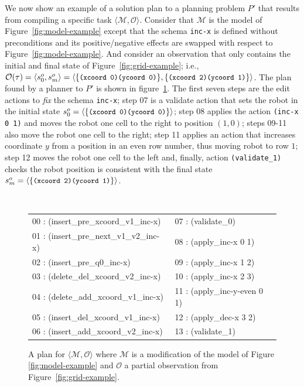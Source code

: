 \documentclass[letterpaper]{article} %
\newcommand{\tup}[1]{{\langle #1 \rangle}}
\begin{document}
We now show an example of a solution plan to a planning problem $P'$ that results from compiling a specific task $\tup{\mathcal{M},\mathcal{O}}$. Consider that $\mathcal{M}$ is the model of Figure~\ref{fig:model-example} except that the schema {\tt\small inc-x} is defined without preconditions and its positive/negative effects are swapped with respect to Figure~\ref{fig:model-example}. And consider an observation that only contains the initial and final state of Figure~\ref{fig:grid-example}; i.e., $\mathcal{O(\tau)}=\tup{s_0^o,s_m^o}=\tup{\{{\texttt{\small{(xcoord 0)(ycoord 0)}}}\}, \{{\texttt{\small{(xcoord 2)(ycoord 1)}}}\}}$. The plan found by a planner to $P'$ is shown in figure~\ref{fig:plan-pdistance}. The first seven steps are the edit actions to \emph{fix} the schema {\tt\small inc-x}; step 07 is a validate action that sets the robot in the initial state $s_0^o=\tup{\{{\texttt{\small{(xcoord 0)(ycoord 0)}}}\}}$; step 08 applies the action {\tt\small (inc-x 0 1)} and moves the robot one cell to the right to position $(1,0)$; steps 09-11 also move the robot one cell to the right; step 11 applies an action that increases coordinate $y$ from a position in an even row number, thus moving robot to row $1$; step 12 moves the robot one cell to the left and, finally, action {\tt\small (validate\_1)} checks the robot position is consistent with the final state $s_m^o=\tup{\{{\texttt{\small{(xcoord 2)(ycoord 1)}}}\}}$.


\begin{figure}
{\tt\tiny
\begin{tabular}{ll}
00 : (insert\_pre\_xcoord\_v1\_inc-x)   & 07 : (validate\_0)\\
01 : (insert\_pre\_next\_v1\_v2\_inc-x) & 08 : (apply\_inc-x 0 1)\\
02 : (insert\_pre\_q0\_inc-x)           & 09 : (apply\_inc-x 1 2)\\
03 : (delete\_del\_xcoord\_v2\_inc-x)   & 10 : (apply\_inc-x 2 3) \\
04 : (delete\_add\_xcoord\_v1\_inc-x)   & 11 : (apply\_inc-y-even 0 1)\\
05 : (insert\_del\_xcoord\_v1\_inc-x)   & 12 : (apply\_dec-x 3 2)\\
06 : (insert\_add\_xcoord\_v2\_inc-x)   & 13 : (validate\_1)
\end{tabular}
}
 \caption{\small A plan for $\tup{\mathcal{M},\mathcal{O}}$ where $\mathcal{M}$ is a modification of the model of Figure \ref{fig:model-example} and $\mathcal{O}$ a partial observation from Figure~\ref{fig:grid-example}.}
\label{fig:plan-pdistance}
\end{figure}
\end{document}

